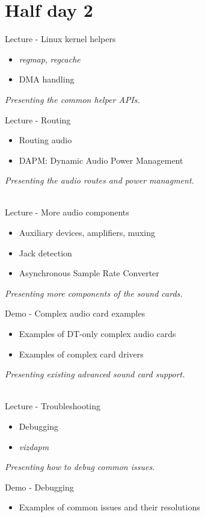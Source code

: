 \documentclass[a4paper,12pt,obeyspaces,spaces,hyphens]{article}
\begin{document}
\section{Half day 2}

\feagendatwocolumn
{Lecture - Linux kernel helpers}
{
  \begin{itemize}
  \item {\em regmap}, {\em regcache}
  \item DMA handling
  \end{itemize}
  \vspace{0.5em}
  {\em Presenting the common helper APIs.}
}
{Lecture - Routing}
{
  \begin{itemize}
  \item Routing audio
  \item DAPM: Dynamic Audio Power Management
  \end{itemize}
  \vspace{0.5em}
  {\em Presenting the audio routes and power managment.}
}
\\

\feagendatwocolumn
{Lecture - More audio components}
{
  \begin{itemize}
  \item Auxiliary devices, amplifiers, muxing
  \item Jack detection
  \item Asynchronous Sample Rate Converter
  \end{itemize}
  \vspace{0.5em}
  {\em Presenting more components of the sound cards.}
}
{Demo - Complex audio card examples}
{
  \begin{itemize}
  \item Examples of DT-only complex audio cards
  \item Examples of complex card drivers
  \end{itemize}
  \vspace{0.5em}
  {\em Presenting existing advanced sound card support.}
}
\\

\feagendatwocolumn
{Lecture - Troubleshooting}
{
  \begin{itemize}
  \item Debugging
  \item {\em vizdapm}
  \end{itemize}
  \vspace{0.5em}
  {\em Presenting how to debug common issues.}
}
{Demo - Debugging}
{
  \begin{itemize}
  \item Examples of common issues and their resolutions
  \end{itemize}
}
\end{document}
